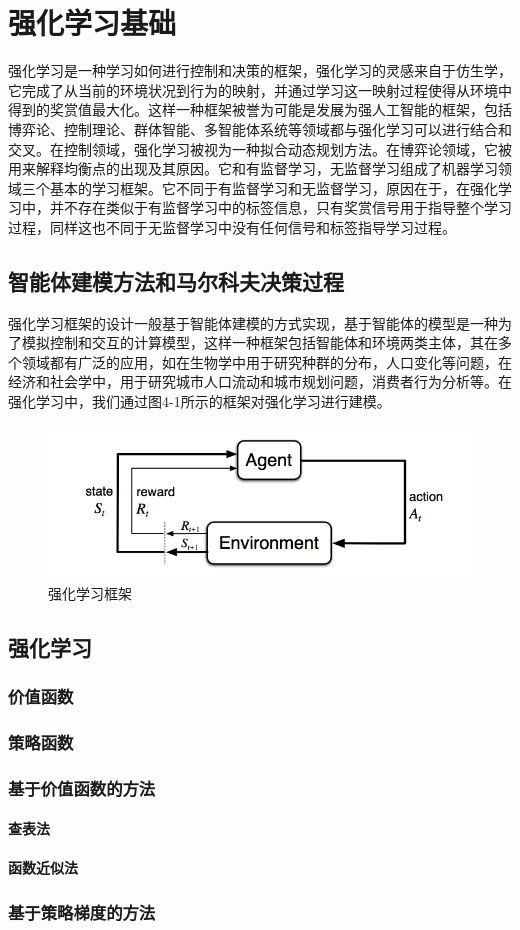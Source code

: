 \documentclass{standalone}
\begin{document}
\chapter{强化学习基础}

强化学习是一种学习如何进行控制和决策的框架，强化学习的灵感来自于仿生学，它完成了从当前的环境状况到行为的映射，并通过学习这一映射过程使得从环境中得到的奖赏值最大化。这样一种框架被誉为可能是发展为强人工智能的框架，包括博弈论、控制理论、群体智能、多智能体系统等领域都与强化学习可以进行结合和交叉。在控制领域，强化学习被视为一种拟合动态规划方法。在博弈论领域，它被用来解释均衡点的出现及其原因。它和有监督学习，无监督学习组成了机器学习领域三个基本的学习框架。它不同于有监督学习和无监督学习，原因在于，在强化学习中，并不存在类似于有监督学习中的标签信息，只有奖赏信号用于指导整个学习过程，同样这也不同于无监督学习中没有任何信号和标签指导学习过程。\par

\section{智能体建模方法和马尔科夫决策过程}
强化学习框架的设计一般基于智能体建模的方式实现，基于智能体的模型是一种为了模拟控制和交互的计算模型，这样一种框架包括智能体和环境两类主体，其在多个领域都有广泛的应用，如在生物学中用于研究种群的分布，人口变化等问题，在经济和社会学中，用于研究城市人口流动和城市规划问题，消费者行为分析等。在强化学习中，我们通过图4-1所示的框架对强化学习进行建模。
\begin{figure}[h]
	\includegraphics[width=12.0cm]{pic/4-1.png}
	\caption{强化学习框架}
	\label{4-1}
\end{figure}
\section{强化学习}

\subsection{价值函数}
\subsection{策略函数}
\subsection{基于价值函数的方法}
\subsubsection{查表法}
\subsubsection{函数近似法}

\subsection{基于策略梯度的方法}
\end{document}
